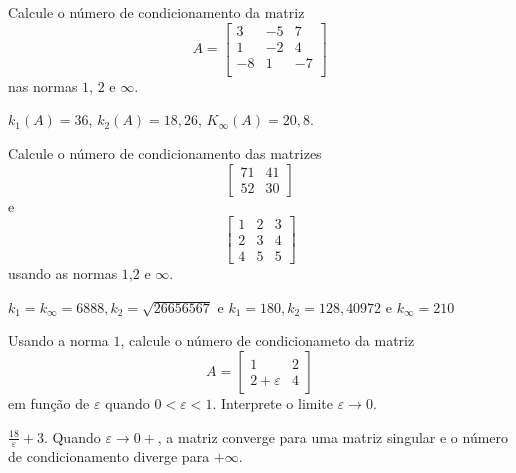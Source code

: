 \begin{Exercise}
  Calcule o número de condicionamento da matriz
$$A=\left[
\begin{array}{ccc}
3 & -5 & 7\\
1 & -2 & 4\\
-8 & 1 & -7\\
\end{array}
\right]$$
nas normas $1$, $2$ e $\infty$.
\end{Exercise}
\begin{Answer}
  \begin{tiny}
  $k_1(A)=36$, $k_2(A)=18,26$, $K_\infty(A)=20,8$.  
  \end{tiny}
\end{Answer}

\begin{Exercise} Calcule o número de condicionamento das matrizes
$$\left[
\begin{array}{cc}
71 & 41\\
52 & 30
\end{array}\right]$$
e
$$\left[
\begin{array}{ccc}
1 & 2 & 3\\
2 & 3 & 4\\
4 & 5 & 5
\end{array}\right]$$
usando as normas $1$,$2$ e $\infty$.
\end{Exercise}
\begin{Answer}
$k_1=k_\infty=6888, k_2=\sqrt{26656567}$ e $k_1=180, k_2= 128,40972  $ e $k_\infty=210$
\end{Answer}

\begin{Exercise}Usando a norma $1$, calcule o número de condicionameto da matriz
$$A=\left[
\begin{array}{cc}
1 & 2\\
2+\varepsilon & 4
\end{array}\right]$$
em função de $\varepsilon$ quando $0<\varepsilon<1$. Interprete o limite $\varepsilon\to 0$.
\end{Exercise}
\begin{Answer}
 $\frac{18}{\varepsilon}+3$. Quando $\varepsilon\to 0+$, a matriz converge para uma matriz singular e o número de condicionamento diverge para $+\infty$.
\end{Answer}

